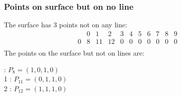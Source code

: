 \documentclass{article}
\begin{document}
{\subsubsection*{Points on surface but on no line}
The surface has 3 points not on any line:\\
$$
\begin{array}{r|*{10}{r}}
 & 0 & 1 & 2 & 3 & 4 & 5 & 6 & 7 & 8 & 9\\
\hline
0 & 8 & 11 & 12 & 0 & 0 & 0 & 0 & 0 & 0 & 0\\
\end{array}
$$
The points on the surface but not on lines are:\\
\begin{multicols}{2}
 : $P_{8}=( 1, 0, 1, 0 )$\\
1 : $P_{11}=( 0, 1, 1, 0 )$\\
2 : $P_{12}=( 1, 1, 1, 0 )$\\
\end{multicols}
}
\end{document}
